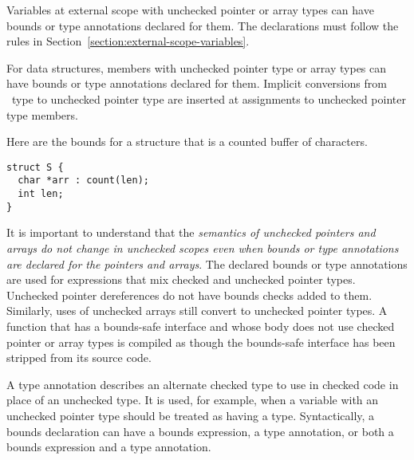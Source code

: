 Variables at external scope with unchecked pointer or array types
can have bounds or type annotations declared for them.
The declarations must follow the
rules in Section~\ref{section:external-scope-variables}.

For data structures, members with unchecked pointer type or array types
can have bounds or type annotations declared for them.   Implicit conversions from
\arrayptr\ type to unchecked pointer type are inserted at assignments to unchecked
pointer type members.

%

Here are the bounds for a structure that is a counted buffer of
characters.
\begin{lstlisting}
struct S {
  char *arr : count(len);
  int len;
}
\end{lstlisting}

It is important to understand that the \emph{semantics of unchecked
pointers and arrays do not change in unchecked scopes even when bounds
or type annotations are declared for the pointers and arrays}. The declared bounds
or type annotations are used for expressions
that mix checked and unchecked pointer types. Unchecked pointer dereferences do not
have bounds checks added to them.  Similarly, uses of unchecked arrays still convert to
unchecked pointer types.   A function that has a bounds-safe
interface and whose body does not use checked pointer or array
types is compiled as though the bounds-safe interface has been
stripped from its source code.

A type annotation describes an alternate checked type to use in checked code
in place of an unchecked type. It is used, for example, when a variable with
an unchecked pointer type should be treated as having
a  type.  Syntactically, a bounds declaration can have
a bounds expression, a type annotation, or both a bounds expression
and a type annotation.

